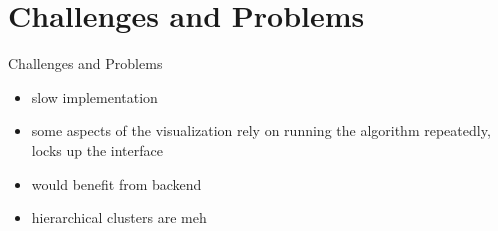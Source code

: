 \documentclass[naustrian]{beamer}
\begin{document}

\section{Challenges and Problems}

\begin{frame}{Challenges and Problems}
    \begin{itemize}
        \item slow implementation
        \item some aspects of the visualization rely on running the algorithm repeatedly, locks up the interface
        \item would benefit from backend
        \item hierarchical clusters are meh
    \end{itemize}
\end{frame}

\end{document}
